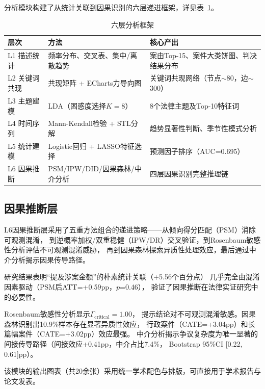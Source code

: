 \documentclass[12pt,a4paper,twoside]{ctexart}
\begin{document}
分析模块构建了从统计关联到因果识别的六层递进框架，详见表~\ref{tab:analysis_layers}。

\begin{table}[H]
\centering
\caption{六层分析框架}
\label{tab:analysis_layers}
\begin{tabular}{@{}llp{7cm}@{}}
\toprule
\textbf{层次} & \textbf{方法} & \textbf{核心产出} \\
\midrule
L1 描述统计     & 频率分布、交叉表、集中/离散趋势   & 案由Top-15、案件大类饼图、判决结果分布 \\
L2 关键词共现   & 共现矩阵 + ECharts力导向图       & 关键词共现网络（节点$\sim$80，边$\sim$300）\\
L3 主题建模     & LDA（困惑度选择$K=8$）           & 8个法律主题及Top-10特征词      \\
L4 时间序列     & Mann-Kendall检验 + STL分解        & 趋势显著性判断、季节性模式分析       \\
L5 统计建模     & Logistic回归 + LASSO特征选择      & 预测因子排序（AUC=0.695）       \\
L6 因果推断     & PSM/IPW/DID/因果森林/中介分析     & 四层因果识别完整推理链          \\
\bottomrule
\end{tabular}
\end{table}

\subsection{因果推断层}

L6因果推断层采用了五重方法组合的递进策略——从倾向得分匹配（PSM）消除可观测混淆，
到逆概率加权/双重稳健（IPW/DR）交叉验证，到Rosenbaum敏感性分析评估不可观测混淆威胁，
再到因果森林探索异质性处理效应，最后通过中介分析揭示因果传导路径。

研究结果表明``提及涉案金额''的朴素统计关联（+5.56个百分点）
几乎完全由混淆因素驱动（PSM后ATT=+0.59pp，$p$=0.46），
验证了因果推断在法律实证研究中的必要性。

Rosenbaum敏感性分析显示$\Gamma_{\text{critical}}=1.00$，
提示结论对不可观测混淆敏感。因果森林识别出10.9\%样本存在显著异质性效应，
行政案件（CATE=+3.04pp）和长篇幅案件（CATE=+3.02pp）效应最强。
中介分析揭示争议复杂度为唯一显著的间接传导路径（间接效应+0.41pp，中介占比7.4\%，
Bootstrap 95\%CI [0.22, 0.61]pp）。

该模块的输出图表（共20余张）采用统一学术配色与排版，可直接用于学术报告与论文发表。

\end{document}

